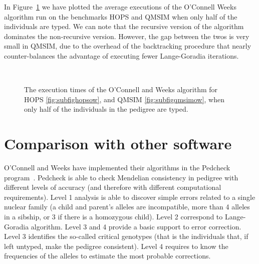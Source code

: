 In Figure~\ref{fig:owtimes} we have plotted the average executions of the
O'Connell Weeks algorithm run on the benchmarks HOPS and QMSIM when only half
of the individuals are typed. We can note that the recursive version of the
algorithm dominates the non-recursive version. However, the gap between the twos
is very small in QMSIM, due to the overhead of the backtracking procedure that
nearly counter-balances the advantage of executing fewer Lange-Goradia
iterations. 

\begin{figure}
  \centering
  \\  
  \caption{The execution times of the O'Connell and Weeks algorithm for HOPS
    \ref{fig:subfighopsow}, and QMSIM \ref{fig:subfigqmsimow}, when only half of
  the individuals in the pedigree are typed.}
  \label{fig:owtimes}
\end{figure}


\section{Comparison with other software}
\label{sec:comp-with-other}
O'Connell and Weeks have implemented their algorithms in the Pedcheck
program~\cite{pedcheck}. Pedcheck is able to check Mendelian consistency in
pedigree with different levels of accuracy (and therefore with different
computational requirements). Level 1 analysis is able to discover simple errors
related to a single nuclear family (a child and parent's alleles are
incompatible, more than 4 alleles in a sibship, or 3 if there is a homozygous
child). Level 2 correspond to Lange-Goradia algorithm. Level 3 and 4 provide a
basic support to error correction. Level 3 identifies the so-called critical
genotypes (that is the individuals that, if left untyped, make the pedigree
consistent). Level 4 requires to know the frequencies of the alleles to estimate
the most probable corrections. 

